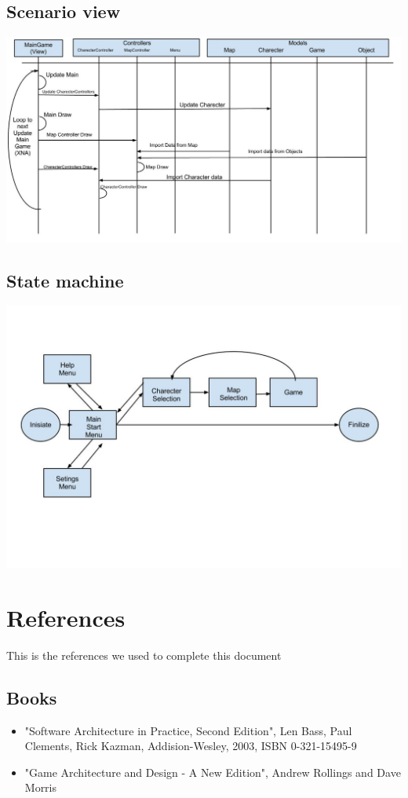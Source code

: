 
\section{Scenario view}
\includegraphics[scale=0.4]{Seq.jpg}

\section{State machine}
\includegraphics[scale=0.45]{State.jpg}

\chapter{References}
This is the references we used to complete this document 
\section{Books}
\begin{itemize}
\item "Software Architecture in Practice, Second Edition", Len Bass, Paul Clements, Rick Kazman, Addision-Wesley, 2003, ISBN 0-321-15495-9
\item "Game Architecture and Design - A New Edition", Andrew Rollings and Dave Morris
\end{itemize}

